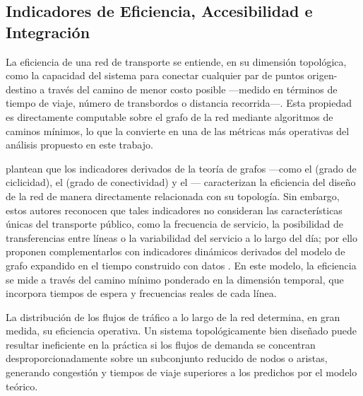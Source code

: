 
\subsection{Indicadores de Eficiencia, Accesibilidad e Integración}
\label{subsec:ea-indicadores}

La eficiencia de una red de transporte se entiende, en su dimensión topológica,
como la capacidad del sistema para conectar cualquier par de puntos
origen-destino a través del camino de menor costo posible ---medido en términos
de tiempo de viaje, número de transbordos o distancia recorrida---. Esta
propiedad es directamente computable sobre el grafo de la red mediante
algoritmos de caminos mínimos, lo que la convierte en una de las métricas más
operativas del análisis propuesto en este trabajo.

\citet{fortin2016innovative} plantean que los indicadores derivados de la teoría
de grafos ---como el  (grado de ciclicidad), el
 (grado de conectividad) y el
--- caracterizan la eficiencia del
diseño de la red de manera directamente relacionada con su topología. Sin
embargo, estos autores reconocen que tales indicadores no consideran las
características únicas del transporte público, como la frecuencia de servicio,
la posibilidad de transferencias entre líneas o la variabilidad del servicio a
lo largo del día; por ello proponen complementarlos con indicadores dinámicos
derivados del modelo de grafo expandido en el tiempo construido con datos
\gtfs{}. En este modelo, la eficiencia se mide a través del camino mínimo
ponderado en la dimensión temporal, que incorpora tiempos de espera y
frecuencias reales de cada línea.

La distribución de los flujos de tráfico a lo largo de la red determina, en gran
medida, su eficiencia operativa. Un sistema topológicamente bien diseñado puede
resultar ineficiente en la práctica si los flujos de demanda se concentran
desproporcionadamente sobre un subconjunto reducido de nodos o aristas,
generando congestión y tiempos de viaje superiores a los predichos por el modelo
teórico.

